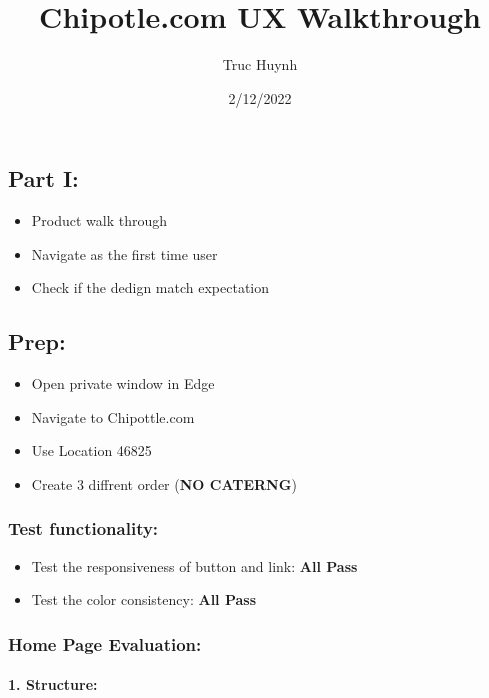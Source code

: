 \documentclass[
]{article}
\title{Chipotle.com UX Walkthrough}
\author{Truc Huynh}
\date{2/12/2022}
\providecommand{\tightlist}{%
  \setlength{\itemsep}{0pt}\setlength{\parskip}{0pt}}
\begin{document}
\maketitle

\hypertarget{part-i}{%
\subsection{Part I:}\label{part-i}}

\begin{itemize}
\tightlist
\item
  Product walk through
\item
  Navigate as the first time user
\item
  Check if the dedign match expectation
\end{itemize}

\hypertarget{prep}{%
\subsection{Prep:}\label{prep}}

\begin{itemize}
\tightlist
\item
  Open private window in Edge
\item
  Navigate to Chipottle.com
\item
  Use Location 46825
\item
  Create 3 diffrent order (\textbf{NO CATERNG})
\end{itemize}

\hypertarget{test-functionality}{%
\subsubsection{Test functionality:}\label{test-functionality}}

\begin{itemize}
\tightlist
\item
  Test the responsiveness of button and link: \textbf{All Pass}
\item
  Test the color consistency: \textbf{All Pass}
\end{itemize}

\hypertarget{home-page-evaluation}{%
\subsubsection{Home Page Evaluation:}\label{home-page-evaluation}}

\hypertarget{structure}{%
\paragraph{1. Structure:}\label{structure}}
\end{document}
